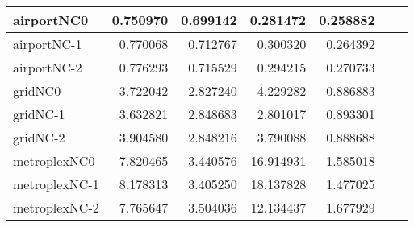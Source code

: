 \begin{longtable}{|l|r|r|r|r|r|r|}
airportNC0 & 0.750970 & 0.699142 & 0.281472 & 0.258882 \\ \hline
airportNC-1 & 0.770068 & 0.712767 & 0.300320 & 0.264392 \\ \hline
airportNC-2 & 0.776293 & 0.715529 & 0.294215 & 0.270733 \\ \hline
gridNC0 & 3.722042 & 2.827240 & 4.229282 & 0.886883 \\ \hline
gridNC-1 & 3.632821 & 2.848683 & 2.801017 & 0.893301 \\ \hline
gridNC-2 & 3.904580 & 2.848216 & 3.790088 & 0.888688 \\ \hline
metroplexNC0 & 7.820465 & 3.440576 & 16.914931 & 1.585018 \\ \hline
metroplexNC-1 & 8.178313 & 3.405250 & 18.137828 & 1.477025 \\ \hline
metroplexNC-2 & 7.765647 & 3.504036 & 12.134437 & 1.677929 \\ \hline
\end{longtable}
